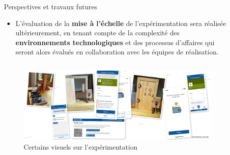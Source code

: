 \documentclass[final]{beamer}
\newlength{\sepwid}
\newlength{\onecolwid}
\newlength{\twocolwid}
\begin{document}
\begin{frame}[t]
\begin{columns}[t]
\begin{column}{\twocolwid}
\begin{columns}[t,totalwidth=\twocolwid]
\begin{column}{\onecolwid}
\begin{alertblock}{Perspectives et travaux futures}
\begin{itemize}
\item L'évaluation de la \textbf{mise à l'échelle} de l'expérimentation sera réalisée ultérieurement, en tenant compte de la complexité des \textbf{environnements technologiques} et des {processus d'affaires} qui seront alors évalués en collaboration avec les équipes de réalisation.

\end{itemize}

\end{alertblock}


\end{column} %

\end{columns} %

\begin{column}{\twocolwid} %


\begin{figure}
\includegraphics[width=0.8\linewidth]{Collage_02.png}
\caption{Certains visuels sur l'expérimentation}
\end{figure}


\end{column} %

\end{column} %


\begin{column}{\sepwid}\end{column} %

\begin{column}{\onecolwid} %


\end{column}
\end{columns}
\end{frame}
\end{document}
